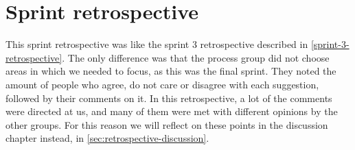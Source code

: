 \section{Sprint retrospective}\label{sec:sprint-4-retrospective}
This sprint retrospective was like the sprint 3 retrospective described in \autoref{sprint-3-retrospective}.
The only difference was that the process group did not choose areas in which we needed to focus, as this was the final sprint.
They noted the amount of people who agree, do not care or disagree with each suggestion, followed by their comments on it.
In this retrospective, a lot of the comments were directed at us, and many of them were met with different opinions by the other groups. 
For this reason we will reflect on these points in the discussion chapter instead, in \autoref{sec:retrospective-discussion}.
